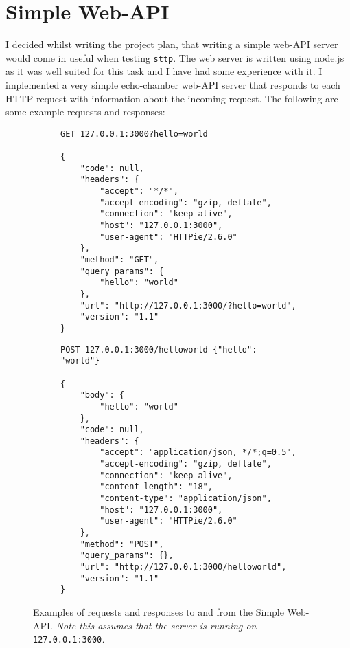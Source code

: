 \section{Simple Web-API}
\label{sec:simple-web-api}

I decided whilst writing the project plan, that writing a simple web-API server would come in useful when testing \verb|sttp|. The web server is written using \href{https://nodejs.org/en/}{node.js} as it was well suited for this task and I have had some experience with it. I implemented a very simple echo-chamber web-API server that responds to each HTTP request with information about the incoming request. The following are some example requests and responses:

\begin{figure}[H]
    \centering
    \begin{subfigure}{.5\textwidth}
        \centering
        \begin{mdframed}
            \begin{Verbatim}[fontsize=\scriptsize]
GET 127.0.0.1:3000?hello=world

{
    "code": null,
    "headers": {
        "accept": "*/*",
        "accept-encoding": "gzip, deflate",
        "connection": "keep-alive",
        "host": "127.0.0.1:3000",
        "user-agent": "HTTPie/2.6.0"
    },
    "method": "GET",
    "query_params": {
        "hello": "world"
    },
    "url": "http://127.0.0.1:3000/?hello=world",
    "version": "1.1"
}
            \end{Verbatim}
        \end{mdframed}
    \end{subfigure}%
    \begin{subfigure}{.5\textwidth}
        \centering
        \begin{mdframed}            
            \begin{Verbatim}[fontsize=\scriptsize]
POST 127.0.0.1:3000/helloworld {"hello": "world"}

{
    "body": {
        "hello": "world"
    },
    "code": null,
    "headers": {
        "accept": "application/json, */*;q=0.5",
        "accept-encoding": "gzip, deflate",
        "connection": "keep-alive",
        "content-length": "18",
        "content-type": "application/json",
        "host": "127.0.0.1:3000",
        "user-agent": "HTTPie/2.6.0"
    },
    "method": "POST",
    "query_params": {},
    "url": "http://127.0.0.1:3000/helloworld",
    "version": "1.1"
}
            \end{Verbatim}
        \end{mdframed}
    \end{subfigure}
    \cprotect\caption{\label{fig:2.2}Examples of requests and responses to and from the Simple Web-API. \textit{Note this assumes that the server is running on }\verb|127.0.0.1:3000|\textit{.}}
\end{figure}

